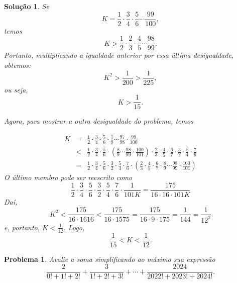 \documentclass{hipatia}
\newtheorem{problem*}{Problema}
\newtheorem*{solution*}{Solução}
\begin{document}
\begin{solution*}
Se $$K = \frac{1}{2}\cdot \frac{3}{4} \cdot \frac{5}{6} \cdots \frac{99}{100},$$ temos
$$K  > \frac{1}{2}\cdot \frac{2}{3} \cdot \frac{4}{5} \cdots \frac{98}{99}.$$
Portanto, multiplicando a igualdade anterior por essa última desigualdade, obtemos:
$$K^2 > \dfrac{1}{200} > \dfrac{1}{225},$$
ou seja, 
$$K > \dfrac{1}{15}.$$

Agora, para mostrar a outra desigualdade do problema, temos 

\begin{eqnarray*}
K & =&  \frac{1}{2} \cdot \frac{3}{4} \cdot \frac{5}{6} \cdot \frac{7}{8}\cdots \frac{97}{98}\cdot \frac{99}{100} \\ 
&<& \frac{1}{2} \cdot \frac{3}{4} \cdot \frac{5}{6} \cdot \left(\frac{8}{9} \cdots \frac{98}{99} \cdot  \frac{100}{101} \right)\cdot \frac{2}{3} \cdot \frac{4}{5} \cdot \frac{6}{7} \cdot \frac{3}{2} \cdot \frac{5}{4} \cdot \frac{7}{6} \\ &=& \frac{1}{2} \cdot \frac{3}{4} \cdot \frac{5}{6} \cdot \frac{3}{2} \cdot \frac{5}{4} \cdot \frac{7}{6} \cdot \left(\frac{2}{3} \cdot \frac{4}{5} \cdot \frac{6}{7}  \cdot \frac{8}{9} \cdots \frac{98}{99} \cdot  \frac{100}{101} \right)
\end{eqnarray*}
O último membro pode ser reescrito como
$$ \frac{1}{2} \cdot \frac{3}{4} \cdot \frac{5}{6} \cdot \frac{3}{2} \cdot \frac{5}{4} \cdot \frac{7}{6} \cdot \frac{1}{101K} = \frac{175}{16 \cdot 16 \cdot 101K}$$ 
Daí,
$$K^2 < \frac{175}{16 \cdot 1616} < \frac{175}{16 \cdot 1575} = \frac{175}{16 \cdot 9 \cdot 175} = \frac{1}{144} = \frac{1}{12^2}$$ e, portanto, $K < \frac{1}{12}$. Logo, $$\frac{1}{15} < K < \frac{1}{12}.$$
\end{solution*}


\begin{problem*}
Avalie a soma simplificando ao máximo sua expressão $$\frac{2}{0! + 1! + 2!} + \frac{3}{1! + 2! + 3!} + \cdots + \frac{2024}{2022! + 2023! + 2024!}. $$
	
\end{problem*}
\end{document}
